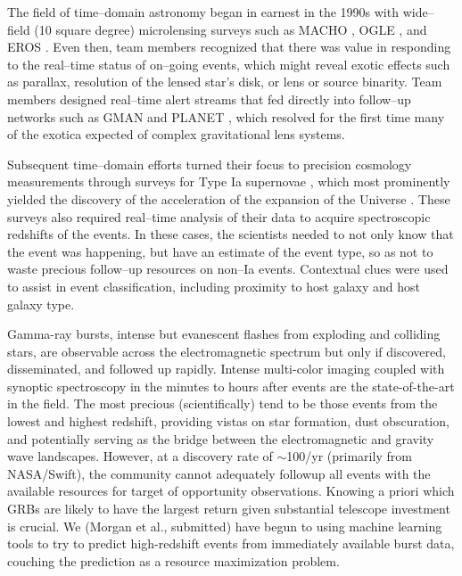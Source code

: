  \smallskip

The field of time--domain astronomy began in earnest in the 1990s with
wide--field (10 square degree) microlensing surveys such as MACHO
\citep{2000ApJ...542..281A}, OGLE \citep{1994AcA....44..227U}, and EROS
\citep{2003A&A...400..951A}.   Even then, team members recognized that there was
value in responding to the real--time status of on--going events, which might
reveal exotic effects such as parallax, resolution of the lensed star's disk, or
lens or source binarity.  Team members designed real--time alert streams that
fed directly into follow--up networks such as GMAN \citep{2000PhDT.......258B}
and PLANET \citep{1998ApJ...509..687A}, which resolved for the first time many
of the exotica expected of complex gravitational lens systems.

Subsequent time--domain efforts turned their focus to precision cosmology
measurements through surveys for Type Ia supernovae \citep{1996AJ....112.2398H},
which most prominently yielded the discovery of the acceleration of the
expansion of the Universe \citep{1998AJ....116.1009R,1999ApJ...517..565P}. These
surveys also required real--time analysis of their data to acquire spectroscopic
redshifts of the events. In these cases, the scientists needed to not only know
that the event was happening, but have an estimate of the event type, so as not
to waste precious follow--up resources on non--Ia events.  Contextual clues were
used to assist in event classification, including proximity to host galaxy and
host galaxy type.

Gamma-ray bursts, intense but evanescent flashes from exploding and colliding
stars, are observable across the electromagnetic spectrum but only if
discovered, disseminated, and followed up rapidly. Intense multi-color imaging
coupled with synoptic spectroscopy in the minutes to hours after events are the
state-of-the-art in the field. The most precious (scientifically) tend to be
those events from the lowest and highest redshift, providing vistas on star
formation, dust obscuration, and potentially serving as the bridge between the
electromagnetic and gravity wave landscapes. However, at a discovery rate of
$\sim$100/yr (primarily from NASA/Swift), the community cannot adequately
followup all events with the available resources for target of opportunity
observations. Knowing a priori which GRBs are likely to have the largest return
given substantial telescope investment is crucial. We (Morgan et al., submitted)
have begun to using machine learning tools to try to predict high-redshift
events from immediately available burst data, couching the prediction as a
resource maximization problem.

